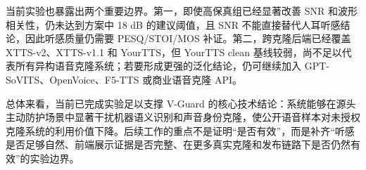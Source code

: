 当前实验也暴露出两个重要边界。第一，即使高保真组已经显著改善 SNR
和波形相关性，仍未达到方案中 18 dB 的建议阈值，且 SNR
不能直接替代人耳听感结论，因此听感质量仍需要 PESQ/STOI/MOS
补证。第二，跨克隆后端已经覆盖 XTTS-v2、XTTS-v1.1 和 YourTTS，但 YourTTS
clean
基线较弱，尚不足以代表所有异构语音克隆系统；若要形成更强的泛化结论，仍可继续加入
GPT-SoVITS、OpenVoice、F5-TTS 或商业语音克隆 API。

总体来看，当前已完成实验足以支撑 V-Guard
的核心技术结论：系统能够在源头主动防护场景中显著干扰机器语义识别和声音身份克隆，使公开语音样本对未授权克隆系统的利用价值下降。后续工作的重点不是证明``是否有效''，而是补齐``听感是否足够自然、前端展示证据是否完整、在更多真实克隆和发布链路下是否仍然有效''的实验边界。

\FloatBarrier
